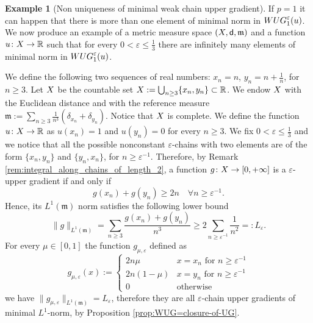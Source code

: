 \documentclass[12pt]{amsart}
\newcommand{\R}{\mathbb{R}}
\newcommand{\sfd}{{\sf d}}
\newcommand{\X}{{\rm X}}
\newcommand{\mm}{\mathfrak m}
\theoremstyle{definition}
\newtheorem{example}[theorem]{Example}
\newcommand{\WUG}[2]{{\rm WUG}_{#1}^{#2}}
\begin{document}
%
\begin{example}[{Non uniqueness of minimal weak chain upper gradient}]
\label{rmk:mWUG_not_unique}
    If $p=1$ it can happen that there is more than one element of minimal norm in $\WUG{1}{\varepsilon}(u)$. We now produce an example of a metric measure space $(\X,\sfd,\mm)$ and a function $u\colon \X \to \R$ such that for every $0<\varepsilon \le \frac{1}{3}$ there are infinitely many elements of minimal norm in $\WUG{1}{\varepsilon}(u)$. 

    We define the following two sequences of real numbers: $x_n = n$, $y_n = n + \frac{1}{n}$, for $n\ge 3$.
    Let $\X$ be the countable set $\X := \bigcup_{n \ge 3} \{ x_n, y_n\}\subset \R$. We endow $\X$ with the Euclidean distance and with the reference measure $\mm := \sum_{n \ge 3} \frac{1}{n^3} \left( \delta_{x_n}+ \delta_{y_n} \right)$. Notice that $\X$ is complete. We define the function $u \colon \X \to \R$ as $u(x_n)=1$ and $u(y_n)=0$ for every $n \ge 3$. We fix $0<\varepsilon\le \frac{1}{3}$ and we notice that all the possible nonconstant $\varepsilon$-chains with two elements are of the form $\{x_n,y_n\}$ and $\{y_n,x_n\}$, for $n\ge \varepsilon^{-1}$. Therefore, by Remark \ref{rem:integral_along_chains_of_length_2}, a function $g\colon \X \to [0,+\infty]$ is a $\varepsilon$-upper gradient if and only if
    \begin{equation}
        \label{eq:example_UG_condition}
        g(x_n) + g(y_n) \ge 2n \quad \forall n \ge \varepsilon^{-1}.
    \end{equation}
    Hence, its $L^1(\mm)$ norm satisfies the following lower bound
    \begin{equation*}
        \|g\|_{L^1(\mm)} = \sum_{n \ge 3} \frac{g(x_n)+g(y_n)}{n^3} \ge 2\sum_{n \ge \varepsilon^{-1}} \frac{1}{n^2} =:L_\varepsilon.
    \end{equation*}
    For every $\mu \in [0,1]$ the function $g_{\mu,\varepsilon}$ defined as
    \begin{equation*}
        g_{\mu,\varepsilon}(x) := \begin{cases}
            2n\mu & x=x_n \text{ for }n \ge \varepsilon^{-1}\\
            2n(1-\mu) & x=y_n \text{ for }n \ge \varepsilon^{-1}\\
            0 & \text{otherwise}
        \end{cases}
    \end{equation*}
    we have $\|g_{\mu,\varepsilon}\|_{L^1(\mm)}=L_\varepsilon$, therefore they are all $\varepsilon$-chain upper gradients of minimal $L^1$-norm, by Proposition \ref{prop:WUG=closure-of-UG}.
\end{example}
\end{document}
